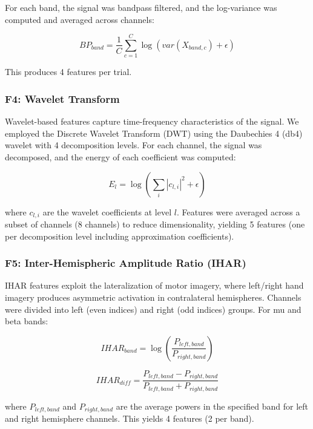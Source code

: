 \documentclass[conference]{IEEEtran}
\begin{document}
For each band, the signal was bandpass filtered, and the log-variance was computed and averaged across channels:

\begin{equation}
BP_{band} = \frac{1}{C}\sum_{c=1}^{C} \log\left(var(X_{band,c}) + \epsilon\right)
\end{equation}

This produces 4 features per trial.

\subsubsection{F4: Wavelet Transform}
Wavelet-based features capture time-frequency characteristics of the signal. We employed the Discrete Wavelet Transform (DWT) using the Daubechies 4 (db4) wavelet with 4 decomposition levels. For each channel, the signal was decomposed, and the energy of each coefficient was computed:

\begin{equation}
E_l = \log\left(\sum_{i} |c_{l,i}|^2 + \epsilon\right)
\end{equation}

where $c_{l,i}$ are the wavelet coefficients at level $l$. Features were averaged across a subset of channels (8 channels) to reduce dimensionality, yielding 5 features (one per decomposition level including approximation coefficients).

\subsubsection{F5: Inter-Hemispheric Amplitude Ratio (IHAR)}
IHAR features exploit the lateralization of motor imagery, where left/right hand imagery produces asymmetric activation in contralateral hemispheres. Channels were divided into left (even indices) and right (odd indices) groups. For mu and beta bands:

\begin{equation}
IHAR_{band} = \log\left(\frac{P_{left,band}}{P_{right,band}}\right)
\end{equation}

\begin{equation}
IHAR_{diff} = \frac{P_{left,band} - P_{right,band}}{P_{left,band} + P_{right,band}}
\end{equation}

where $P_{left,band}$ and $P_{right,band}$ are the average powers in the specified band for left and right hemisphere channels. This yields 4 features (2 per band).
\end{document}
